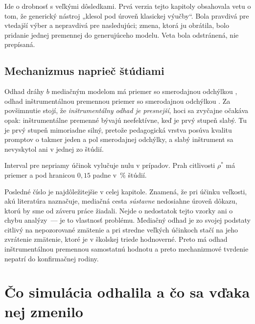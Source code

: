 Ide o drobnosť s veľkými dôsledkami. Prvá verzia tejto kapitoly obsahovala vetu o tom, že generický nástroj „klesol pod úroveň klasickej výučby“. Bola pravdivá pre vtedajší výber a nepravdivá pre nasledujúci; zmena, ktorá ju obrátila, bolo pridanie jednej premennej do generujúceho modelu. Veta bola odstránená, nie prepísaná.

\subsection{Mechanizmus naprieč štúdiami}

Odhad dráhy $b$ mediačným modelom má priemer \valBmed{} so smerodajnou odchýlkou \valBmedSd, odhad inštrumentálnou premennou priemer \valBiv{} so smerodajnou odchýlkou \valBivSd. Za povšimnutie stojí, že \emph{inštrumentálny odhad je presnejší}, hoci sa zvyčajne očakáva opak: inštrumentálne premenné bývajú neefektívne, keď je prvý stupeň slabý. Tu je prvý stupeň mimoriadne silný, pretože pedagogická vrstva posúva kvalitu promptov o takmer jeden a pol smerodajnej odchýlky, a slabý inštrument sa nevyskytol ani v jednej zo \valReps{} štúdií.

Interval pre nepriamy účinok vylučuje nulu v \valIndirect{} prípadov. Prah citlivosti $\rho^\ast$ má priemer \valRhoMean{} a pod hranicou $0{,}15$ padne v \valRhoFragile\,\% štúdií.

Posledné číslo je najdôležitejšie v celej kapitole. Znamená, že pri účinku veľkosti, akú literatúra naznačuje, mediačná cesta \emph{sústavne} nedosiahne úroveň dôkazu, ktorú by sme od záveru práce žiadali. Nejde o nedostatok tejto vzorky ani o chybu analýzy~--- je to vlastnosť problému. Mediačný odhad je zo svojej podstaty citlivý na nepozorované zmätenie a pri stredne veľkých účinkoch stačí na jeho zvrátenie zmätenie, ktoré je v školskej triede hodnoverné. Preto má odhad inštrumentálnou premennou samostatnú hodnotu a preto mechanizmové tvrdenie nepatrí do konfirmačnej rodiny.

\section{Čo simulácia odhalila a čo sa vďaka nej zmenilo}
\label{sec:co-odhalila-simulacia}

